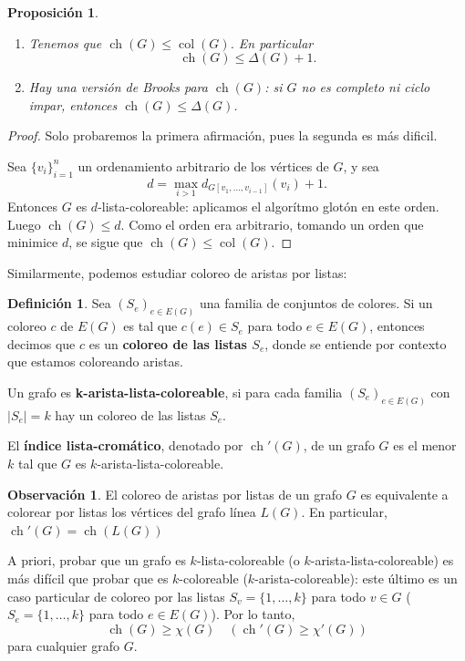 \documentclass[12pt]{report}
\theoremstyle{plain}
\newtheorem{proposition}[theorem]{Proposición}
\theoremstyle{definition}
\newtheorem{definition}[theorem]{Definición}
\newtheorem{obs}[theorem]{Observación}
\newenvironment{Obs}{\colorlet{shadecolor}{Dandelion!22} \begin{shaded} \begin{obs}}{ \end{obs} \end{shaded}}
\newcommand{\abs}[1]{\left \vert #1 \right \vert}
\newcommand{\col}[1]{\operatorname{col} (#1)}
\newcommand{\ch}[1]{\operatorname{ch} (#1)}
\begin{document}
\begin{proposition}\label{proposicion:choice es menor o igual que coloreo menor o igual que delta + 1}
\begin{enumerate}
\item Tenemos que $\ch G \leq \col G$. En particular
\[\ch G \leq \Delta (G) + 1.\]
\item Hay una versión de Brooks para $\ch G$: si $G$ no es completo ni ciclo impar, entonces $\ch G \leq \Delta (G)$.
\end{enumerate}
\end{proposition}
\begin{proof}
Solo probaremos la primera afirmación, pues la segunda es más dificil.

Sea $\{v_i\}_{i = 1}^n$ un ordenamiento arbitrario de los vértices de $G$, y sea
\[
    d = \max_{i>1}d_{G[v_1, \ldots, v_{i-1}]} (v_i) + 1.
\]
Entonces $G$ es $d$-lista-coloreable: aplicamos el algorítmo glotón en este orden. Luego $\ch G \leq d$. Como el orden era arbitrario, tomando un orden que minimice $d$, se sigue que $\ch G \leq \col G$.
\end{proof}




\bigskip

Similarmente, podemos estudiar coloreo de aristas por listas:

\begin{definition}
Sea $(S_e)_{e \in E(G)}$ una familia de conjuntos de colores. Si un coloreo $c$ de $E(G)$ es tal que $c(e) \in S_e$ para todo $e \in E(G)$, entonces decimos que $c$ es un \textbf{coloreo de las listas $S_e$}, donde se entiende por contexto que estamos coloreando aristas.

Un grafo es \textbf{k-arista-lista-coloreable}, si para cada familia $(S_e)_{e \in E(G)}$ con $\abs {S_e} = k$ hay un coloreo de las listas $S_e$.

El \textbf{índice lista-cromático}, denotado por $\operatorname{ch}' (G)$, de un grafo $G$ es el menor $k$ tal que $G$ es $k$-arista-lista-coloreable.
\end{definition}

\begin{Obs}
El coloreo de aristas por listas de un grafo $G$ es equivalente a colorear por listas los vértices del grafo línea $L(G)$. En particular, $\operatorname{ch}' (G) = \ch {L(G)}$
\end{Obs}

A priori, probar que un grafo es $k$-lista-coloreable (o $k$-arista-lista-coloreable) es más difícil que probar que es $k$-coloreable ($k$-arista-coloreable): este último es un caso particular de coloreo por las listas $S_v = \{1,\ldots, k\}$ para todo $v \in G$ ($S_e = \{1, \ldots, k\}$ para todo $e \in E(G)$). Por lo tanto,
\[
    \ch G \geq \chi (G) \quad (\operatorname{ch}' (G) \geq \chi ' (G))
\]
para cualquier grafo $G$.
\end{document}
